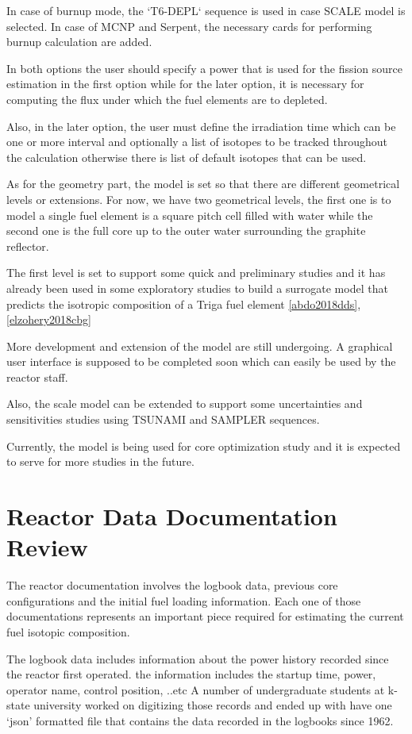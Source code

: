 \documentclass[review]{elsarticle}
\begin{document}
 In case of burnup mode, the `T6-DEPL` sequence is used in case SCALE model is selected. In case of MCNP and Serpent, the necessary cards for performing burnup calculation are added. 
 
 In both options the user should specify a power that is used for the fission source estimation in the first option while for the later option, it is necessary for computing the flux under which the fuel elements are to depleted.
 
 Also, in the later option, the user must define the irradiation time which can be one or more interval and optionally a list of isotopes to be tracked throughout the calculation otherwise there is list of default isotopes that can be used.
 
 As for the geometry part, the model is set so that there are different geometrical levels or extensions. For now, we have two geometrical levels, the first one is to model a single fuel element is a square pitch cell filled with water while the second one is the full core up to the outer water surrounding the graphite reflector.
 
 The first level is set to support some quick and preliminary studies and it has already been used in some exploratory studies to build a surrogate model that predicts the isotropic composition of a Triga fuel element \ref{abdo2018dds}, \ref{elzohery2018cbg}
 
 More development and extension of the model are still undergoing. A graphical user interface is supposed to be completed soon which can easily be used by the reactor staff.
 
 Also, the scale model can be extended to support some uncertainties and sensitivities studies using TSUNAMI and SAMPLER sequences.
 
 Currently, the model is being used for core optimization study and it is expected to serve for more studies in the future.
 
\section{Reactor Data Documentation Review}
The reactor documentation involves the logbook data, previous core configurations and the initial fuel loading information.
Each one of those documentations represents an important piece required for estimating the current fuel isotopic composition.

The logbook data includes information about the power history recorded since the reactor first operated. the information includes the startup time, power, operator name, control position, ..etc
A number of undergraduate students at k-state university worked on digitizing those records and ended up with have one `json' formatted file that contains the data recorded in the logbooks since 1962.
\end{document}
